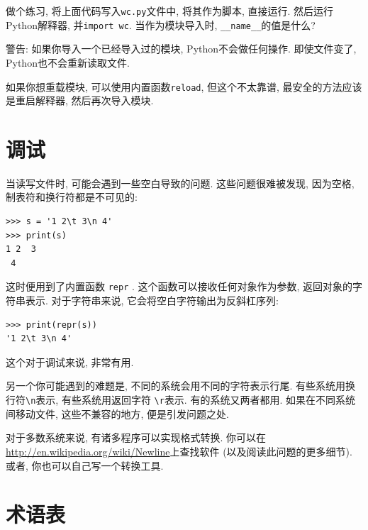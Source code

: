 \documentclass[10pt]{book}
\begin{document}
做个练习, 将上面代码写入{\tt wc.py}文件中, 将其作为脚本, 直接运行. 
然后运行Python解释器, 并{\tt import wc}. 
当作为模块导入时, \verb"__name__"的值是什么?

警告: 如果你导入一个已经导入过的模块, Python不会做任何操作. 
即使文件变了, Python也不会重新读取文件. 

如果你想重载模块, 可以使用内置函数{\tt reload}, 
但这个不太靠谱, 最安全的方法应该是重启解释器, 然后再次导入模块. 

\section{调试}

当读写文件时, 可能会遇到一些空白导致的问题. 
这些问题很难被发现, 因为空格, 制表符和换行符都是不可见的:

\begin{verbatim}
>>> s = '1 2\t 3\n 4'
>>> print(s)
1 2	 3
 4
\end{verbatim}

这时便用到了内置函数 {\tt repr} . 
这个函数可以接收任何对象作为参数, 返回对象的字符串表示. 
对于字符串来说, 它会将空白字符输出为反斜杠序列:

\begin{verbatim}
>>> print(repr(s))
'1 2\t 3\n 4'
\end{verbatim}

这个对于调试来说, 非常有用. 

另一个你可能遇到的难题是, 不同的系统会用不同的字符表示行尾. 
有些系统用换行符\verb"\n"表示, 有些系统用返回字符 \verb"\r"表示. 
有的系统又两者都用. 
如果在不同系统间移动文件, 这些不兼容的地方, 便是引发问题之处. 

对于多数系统来说, 有诸多程序可以实现格式转换. 
你可以在\url{http://en.wikipedia.org/wiki/Newline}上查找软件
(以及阅读此问题的更多细节). 
或者, 你也可以自己写一个转换工具. 


\section{术语表}
\end{document}
